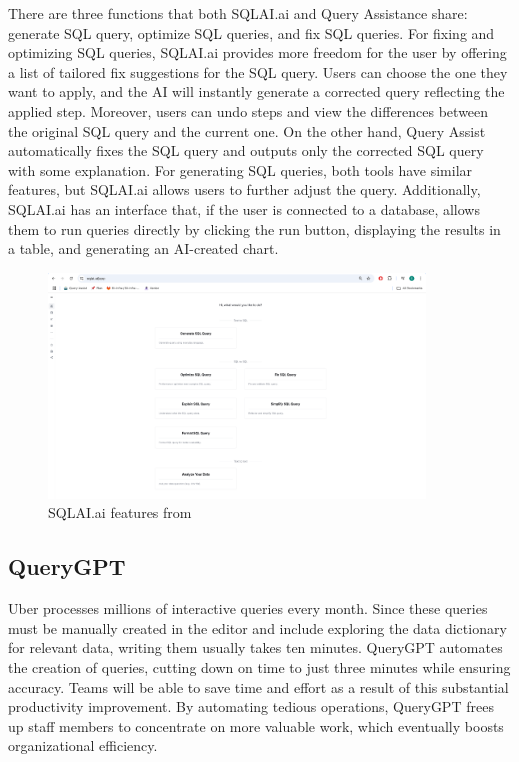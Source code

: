     There are three functions that both SQLAI.ai and Query Assistance share: generate SQL query, optimize SQL queries, and fix SQL queries. For fixing and optimizing SQL queries, SQLAI.ai provides more freedom for the user by offering a list of tailored fix suggestions for the SQL query. Users can choose the one they want to apply, and the AI will instantly generate a corrected query reflecting the applied step. Moreover, users can undo steps and view the differences between the original SQL query and the current one. On the other hand, Query Assist automatically fixes the SQL query and outputs only the corrected SQL query with some explanation. For generating SQL queries, both tools have similar features, but SQLAI.ai allows users to further adjust the query. Additionally, SQLAI.ai has an interface that, if the user is connected to a database, allows them to run queries directly by clicking the run button, displaying the results in a table, and generating an AI-created chart. 
    \cite{SQLAI}
    \begin{figure}[H]
        \centering
        \includegraphics[width=10cm]{chapters/2/figures/sqlai.png}
        \caption[SQLAI.ai features]{SQLAI.ai features  from~\cite{SQLAI}}
        \label{fig:sqlai}
    \end{figure}

    \subsection{QueryGPT}
    Uber processes millions of interactive queries every month. Since these queries must be manually created in the editor and include exploring the data dictionary for relevant data, writing them usually takes ten minutes. QueryGPT automates the creation of queries, cutting down on time to just three minutes while ensuring accuracy. Teams will be able to save time and effort as a result of this substantial productivity improvement. By automating tedious operations, QueryGPT frees up staff members to concentrate on more valuable work, which eventually boosts organizational efficiency.

